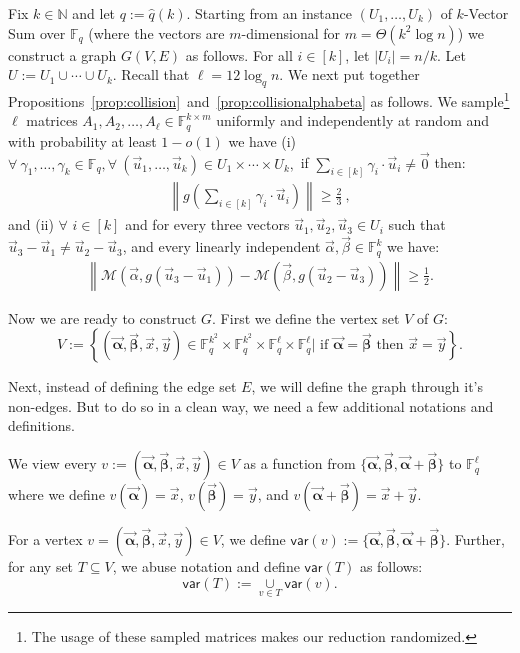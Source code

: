 \documentclass[10pt,a4paper]{article}
\newcommand{\F}{\mathbb{F}}
\renewcommand{\ge}{ \geqslant}
\newcommand{\alphab}{\vec{\bm{\alpha}}}
\newcommand{\betab}{\vec{\bm{\beta}}}
\newcommand{\var}{\mathsf{var}}
\newcommand{\M}{\mathcal{M}}
\begin{document}
Fix $k\in\mathbb{N}$ and let $q:=\hat{q}(k)$.
Starting from an instance $(U_1,\ldots ,U_k)$ of $k$-Vector Sum over $\F_q$ (where the vectors are $m$-dimensional for $m=\Theta(k^2\log n)$) we  construct a graph $G(V,E)$ as follows. For all $i\in[k]$, let $|U_i|=n/k$. Let $U:=U_1\cup\cdots\cup U_k$.  Recall that $\ell=12\log_q n$. We next put together  Propositions~\ref{prop:collision}~and~\ref{prop:collisionalphabeta} as follows. We sample\footnote{The usage of these sampled matrices makes our reduction randomized.} $\ell$ matrices $A_1,A_2,\ldots,A_\ell\in \mathbb{F}_q^{k\times m}$ uniformly and independently at random and  with probability at least $1-o(1)$ we have (i) $\forall\ \gamma_1,\ldots ,\gamma_k\in \F_q, \forall\ (\vec{u}_1,\ldots ,\vec{u}_k)\in U_1\times \cdots \times U_k,$ if $\underset{i\in[k]}{\sum}\gamma_i\cdot \vec{u}_i\neq \vec{0}$ then:
\begin{align}
\left\|g\left(\sum_{i\in[k]}\gamma_i\cdot \vec{u}_i\right)\right\|\ge \frac{2}{3}\ ,\label{prop1}
\end{align} 
and (ii) $\forall$ $i\in [k]$ and for every three vectors $\vec{u}_1,\vec{u}_2,\vec{u}_3\in U_i$ such that $\vec{u}_3-\vec{u}_1\neq \vec{u}_2-\vec{u}_3$, and every linearly independent $\vec{\alpha},\vec{\beta}\in \F_q^k$ we have: 
\begin{align}
\left\|\M\left(\vec{\alpha},g(\vec{u}_3-\vec{u}_1)\right)- \M\left(\vec{\beta},g(\vec{u}_2-\vec{u}_3)\right)\right\|\ge \frac{1}{2}.\label{prop2}
\end{align} 

Now we are ready to construct $G$. First we define the vertex set $V$ of $G$:
$$
V:=\left\{(\alphab,\betab,\vec{x},\vec{y})\in \F_q^{k^2}\times\F_q^{k^2}\times \F_q^{\ell}\times \F_q^{\ell}\big| \text{ if }\alphab= \betab\text{ then }\vec{x}=\vec{y}\right\}.
$$

 Next, instead of defining the edge set $E$, we will define the graph through it's non-edges. But to do so in a clean way, we need a few additional notations and definitions.
 
 
We view every $v:=(\alphab,\betab,\vec{x},\vec{y})\in V$ as a function from $\{\alphab,\betab,\alphab+\betab\}$ to $\F_q^\ell$ where we define $v(\alphab)=\vec{x}$, $v(\betab)=\vec{y}$, and $v(\alphab+\betab)=\vec{x}+\vec{y}$. 


For a vertex $v=(\alphab,\betab,\vec{x},\vec{y})\in V$, we define $\var(v):=\{\alphab,\betab,\alphab+\betab\}$. Further, for any set $T\subseteq V$, we abuse notation and  define $\var(T)$ as follows:
$$
\var(T):=\underset{v\in T}{\cup}\var(v).
$$
\end{document}
